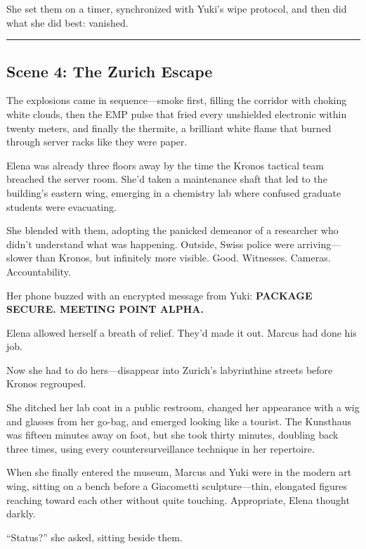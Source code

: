 She set them on a timer, synchronized with Yuki's wipe protocol, and then did what she did best: vanished.

\begin{center}\rule{0.5\linewidth}{0.5pt}\end{center}

\hypertarget{scene-4-the-zurich-escape}{%
\subsection{Scene 4: The Zurich Escape}\label{scene-4-the-zurich-escape}}

The explosions came in sequence---smoke first, filling the corridor with choking white clouds, then the EMP pulse that fried every unshielded electronic within twenty meters, and finally the thermite, a brilliant white flame that burned through server racks like they were paper.

Elena was already three floors away by the time the Kronos tactical team breached the server room. She'd taken a maintenance shaft that led to the building's eastern wing, emerging in a chemistry lab where confused graduate students were evacuating.

She blended with them, adopting the panicked demeanor of a researcher who didn't understand what was happening. Outside, Swiss police were arriving---slower than Kronos, but infinitely more visible. Good. Witnesses. Cameras. Accountability.

Her phone buzzed with an encrypted message from Yuki: \textbf{PACKAGE SECURE. MEETING POINT ALPHA.}

Elena allowed herself a breath of relief. They'd made it out. Marcus had done his job.

Now she had to do hers---disappear into Zurich's labyrinthine streets before Kronos regrouped.

She ditched her lab coat in a public restroom, changed her appearance with a wig and glasses from her go-bag, and emerged looking like a tourist. The Kunsthaus was fifteen minutes away on foot, but she took thirty minutes, doubling back three times, using every countersurveillance technique in her repertoire.

When she finally entered the museum, Marcus and Yuki were in the modern art wing, sitting on a bench before a Giacometti sculpture---thin, elongated figures reaching toward each other without quite touching. Appropriate, Elena thought darkly.

``Status?'' she asked, sitting beside them.

